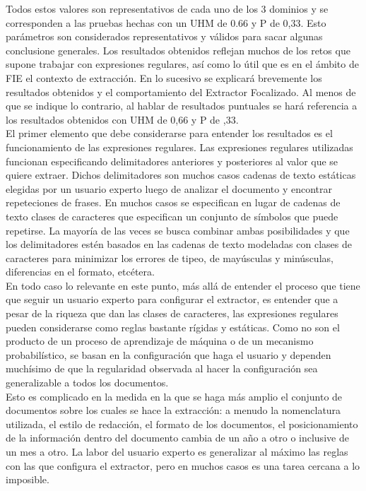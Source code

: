 Todos estos valores son representativos de cada uno de los 3 dominios y se corresponden a las pruebas hechas con un UHM de 0.66 y P de 0,33. Esto parámetros son considerados representativos y válidos para sacar algunas conclusione generales. Los resultados obtenidos reflejan muchos de los retos que supone trabajar con expresiones regulares, así como lo útil que es en el ámbito de FIE el contexto de extracción.  En lo sucesivo se explicará brevemente los resultados obtenidos y el comportamiento del Extractor Focalizado. Al menos de que se indique lo contrario, al hablar de resultados puntuales se hará referencia a los resultados obtenidos con UHM de 0,66 y P de ,33. \\

El primer elemento que debe considerarse para entender los resultados es el funcionamiento de las expresiones regulares. Las expresiones regulares utilizadas funcionan especificando delimitadores anteriores y posteriores al valor que se quiere extraer. Dichos delimitadores son muchos casos cadenas de texto estáticas elegidas por un usuario experto luego de analizar el documento y encontrar repeteciones de frases. En muchos casos se especifican en lugar de cadenas de texto clases de caracteres que especifican un conjunto de símbolos que puede repetirse. La mayoría de las veces se busca combinar ambas posibilidades y que los delimitadores estén basados en las cadenas de texto modeladas con clases de caracteres para minimizar los errores de tipeo, de mayúsculas y minúsculas, diferencias en el formato, etcétera. \\

En todo caso lo relevante en este punto, más allá de entender el proceso que tiene que seguir un usuario experto para configurar el extractor, es entender que a pesar de la riqueza que dan las clases de caracteres,  las expresiones regulares pueden considerarse como reglas bastante rígidas y estáticas. Como no son el producto de un proceso de aprendizaje de máquina o de un mecanismo probabilístico, se basan en la configuración que haga el usuario y dependen muchísimo de que la regularidad observada al hacer la configuración sea generalizable a todos los documentos. \\

Esto es complicado en la medida en la que se haga más amplio el conjunto de documentos sobre los cuales se hace la extracción: a menudo la nomenclatura utilizada, el estilo de redacción, el formato de los documentos, el posicionamiento de la información dentro del documento cambia de un año a otro o inclusive de un mes a otro. La labor del usuario experto es generalizar al máximo las reglas con las que configura el extractor, pero en muchos casos es una tarea cercana a lo imposible.\\

